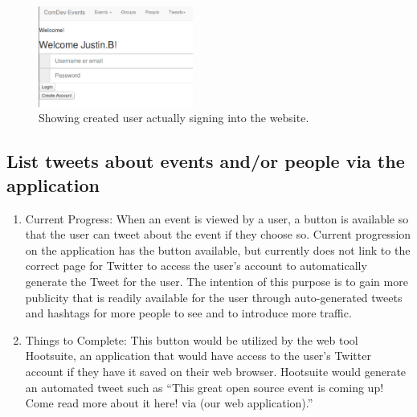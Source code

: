 \documentclass[letterpaper,10pt,onecolumn]{IEEEtran} %
\begin{document}
\begin{figure}[htp]
  \begin{center}
  
  \includegraphics[width=2in]{loginSuccess}
  \centering
  \caption{Showing created user actually signing into the website. }

  \end{center}
\end{figure}

\subsection{List tweets about events and/or people via the application}
\begin{enumerate}[label*=\arabic*.]
\item Current Progress: When an event is viewed by a user, a button is available so that the user can tweet about the event if they choose so. Current progression on the application has the button available, but currently does not link to the correct page for Twitter to access the user’s account to automatically generate the Tweet for the user. The intention of this purpose is to gain more publicity that is readily available for the user through auto-generated tweets and hashtags for more people to see and to introduce more traffic.

\item Things to Complete: This button would be utilized by the web tool Hootsuite, an application that would have access to the user’s Twitter account if they have it saved on their web browser. Hootsuite would generate an automated tweet such as “This great open source event is coming up! Come read more about it here! via (our web application).”
\end{enumerate}
\end{document}
